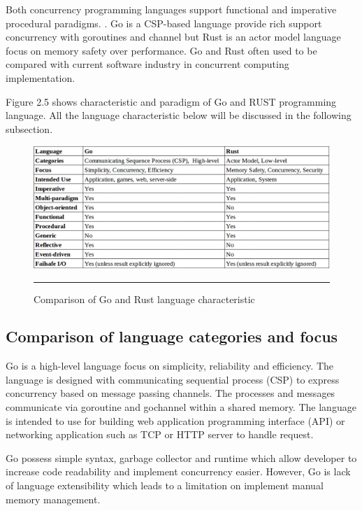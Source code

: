 Both concurrency programming languages support functional and imperative procedural paradigms. \cite{go-lang} \cite{rust-lang}. Go is a CSP-based language provide rich support concurrency with goroutines and channel  \cite{intro-to-go} but Rust is an actor model language focus on memory safety over performance. \cite{rust-memory-guarantees} Go and Rust often used to be compared with current software industry in concurrent computing implementation.  \cite{rust-vs-go-news}

Figure 2.5 shows characteristic and paradigm of Go and RUST programming language. All the language characteristic below will be discussed in the following subsection.

\begin{figure}[H]
	\centering
	\includegraphics[width=1.0\textwidth]{Figure/go-vs-rust.png}
	\rule{35em}{0.5pt}
	\caption[Comparison of Go and Rust language characteristic]{Comparison of Go and Rust language characteristic}
\end{figure}

\subsection{Comparison of language categories and focus}

Go is a high-level language focus on simplicity, reliability and efficiency. The language is designed with communicating sequential process (CSP) to express concurrency based on message passing channels. The processes and messages communicate via goroutine and gochannel within a shared memory. \cite{go-csp} The language is intended to use for building web application programming interface (API) or networking application such as TCP or HTTP server to handle request.

Go possess simple syntax, garbage collector and runtime which allow developer to increase code readability and implement concurrency easier. However, Go is lack of language extensibility which leads to a limitation on implement manual memory management. \cite{go-problem}

